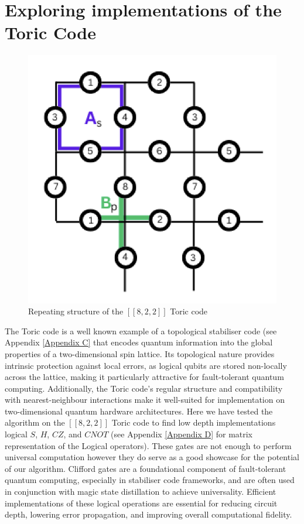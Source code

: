 \section{Exploring implementations of the Toric Code}

\begin{figure}[h]
    \centering
    \includegraphics[width=0.5\linewidth]{Logos/Screenshot 2025-04-01 at 13.41.28.png}
    \caption{Repeating structure of the \([[8,2,2]]\) Toric code}
    \label{fig:[[8,2,2]] Toric code}
\end{figure}

The Toric code is a well known example of a topological stabiliser code (see Appendix \ref{Appendix C} that encodes quantum information into the global properties of a two-dimensional spin lattice. Its topological nature provides intrinsic protection against local errors, as logical qubits are stored non-locally across the lattice, making it particularly attractive for fault-tolerant quantum computing. Additionally, the Toric code's regular structure and compatibility with nearest-neighbour interactions make it well-suited for implementation on two-dimensional quantum hardware architectures. Here we have tested the algorithm on the \([[8,2,2]]\) Toric code to find low depth implementations logical \(S\), \(H\), \(CZ\), and \(CNOT\) (see Appendix \ref{Appendix D} for matrix representation of the Logical operators). These gates are not enough to perform universal computation however they do serve as a good showcase for the potential of our algorithm. Clifford gates are a foundational component of fault-tolerant quantum computing, especially in stabiliser code frameworks, and are often used in conjunction with magic state distillation to achieve universality. Efficient implementations of these logical operations are essential for reducing circuit depth, lowering error propagation, and improving overall computational fidelity.


